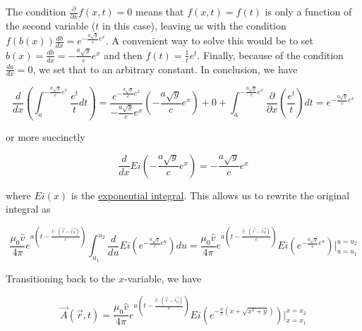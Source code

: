 ﻿\documentclass{article}
\begin{document}
The condition $\frac{\partial}{\partial x} f(x, t) = 0$ means that $f(x, t) = f(t)$ is only a function of the second variable ($t$ in this case), leaving us with the condition $f(b(x)) \frac{db}{dx} = e^{- \frac{a \sqrt{y}}{c} e^x}$. A convenient way to solve this would be to set $b(x) = \frac{db}{dx} = - \frac{a \sqrt{y}}{c} e^x$ and then $f(t) = \frac{1}{t} e^t$. Finally, because of the condition $\frac{da}{dx} = 0$, we set that to an arbitrary constant. In conclusion, we have

\begin{equation*}
    \frac{d}{dx} \left( \int_{a}^{- \frac{a \sqrt{y}}{c} e^x} \frac{e^t}{t} dt \right) = \frac{e^{- \frac{a \sqrt{y}}{c} e^x}}{- \frac{a \sqrt{y}}{c} e^x} (- \frac{a \sqrt{y}}{c} e^x) + 0 + \int_a^{- \frac{a \sqrt{y}}{c} e^x} \frac{\partial}{\partial x} (\frac{e^t}{t}) dt = e^{- \frac{a \sqrt{y}}{c} e^x}
\end{equation*}

or more succinctly

\begin{equation*}
    \frac{d}{dx} Ei(- \frac{a \sqrt{y}}{c} e^x) = - \frac{a \sqrt{y}}{c} e^x
\end{equation*}

where $Ei(x)$ is the \href{https://en.wikipedia.org/wiki/Exponential_integral}{exponential integral}. This allows us to rewrite the original integral as

\begin{equation*}
    \frac{\mu_0 \hat{v}}{4 \pi} e^{a(t - \frac{\hat{v} \cdot (\vec{r} - \vec{r_0})}{c})} \int_{u_1}^{u_2} \frac{d}{du} Ei(e^{- \frac{a \sqrt{y}}{c} e^u}) du = \frac{\mu_0 \hat{v}}{4 \pi} e^{a(t - \frac{\hat{v} \cdot (\vec{r} - \vec{r_0})}{c})} Ei(e^{- \frac{a \sqrt{y}}{c} e^u}) |_{u = u_1}^{u = u_2}
\end{equation*}

Transitioning back to the $x$-variable, we have

\begin{equation}
    \label{eq:effectOfAStationaryStraightWireWithExponentialCurrentOnA}
    \vec{A}(\vec{r}, t) = \frac{\mu_0 \hat{v}}{4 \pi} e^{a(t - \frac{\hat{v} \cdot (\vec{r} - \vec{r_0})}{c})} Ei(e^{- \frac{a}{c} (x + \sqrt{x^2 + y})}) |_{x = x_1}^{x = x_2}
\end{equation}
\end{document}
